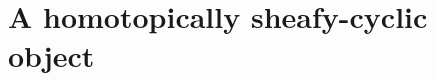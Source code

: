 \documentclass[12pt]{nuthesis} %
\theoremstyle{definition}
\theoremstyle{remark}
\theoremstyle{example}
\begin{document}
\chapter{A homotopically sheafy-cyclic object}
	
	
	
	
	
	

\begin{singlespace}
\clearpage{} %

\end{singlespace}

\appendix		%



\end{document}
